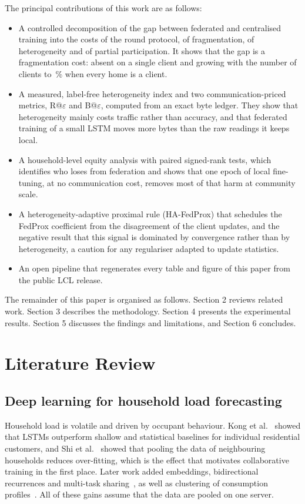 The principal contributions of this work are as follows:
\begin{itemize}
\item A controlled decomposition of the gap between federated and centralised training into the costs of the round
protocol, of fragmentation, of heterogeneity and of partial participation. It shows that the gap is a fragmentation
cost: absent on a single client and growing with the number of clients to \nosign{\EonethreefedavghouseholdGap}\,\%
when every home is a client.
\item A measured, label-free heterogeneity index and two communication-priced metrics, R@$\varepsilon$ and
B@$\varepsilon$, computed from an exact byte ledger. They show that heterogeneity mainly costs traffic rather than
accuracy, and that federated training of a small LSTM moves more bytes than the raw readings it keeps local.
\item A household-level equity analysis with paired signed-rank tests, which identifies who loses from federation and
shows that one epoch of local fine-tuning, at no communication cost, removes most of that harm at community scale.
\item A heterogeneity-adaptive proximal rule (HA-FedProx) that schedules the FedProx coefficient from the disagreement
of the client updates, and the negative result that this signal is dominated by convergence rather than by
heterogeneity, a caution for any regulariser adapted to update statistics.
\item An open pipeline that regenerates every table and figure of this paper from the public LCL release.
\end{itemize}

The remainder of this paper is organised as follows. Section 2 reviews related work. Section 3 describes the
methodology. Section 4 presents the experimental results. Section 5 discusses the findings and limitations, and
Section 6 concludes.

\section{Literature Review}

\subsection{Deep learning for household load forecasting}
Household load is volatile and driven by occupant behaviour. Kong et al.~\cite{kong2019stlf} showed that LSTMs
outperform shallow and statistical baselines for individual residential customers, and Shi et al.~\cite{shi2018pdrnn}
showed that pooling the data of neighbouring households reduces over-fitting, which is the effect that motivates
collaborative training in the first place. Later work added embeddings, bidirectional recurrences and multi-task
sharing~\cite{aurangzeb2024,xiao2023}, as well as clustering of consumption profiles~\cite{dab2023}. All of these gains
assume that the data are pooled on one server.

